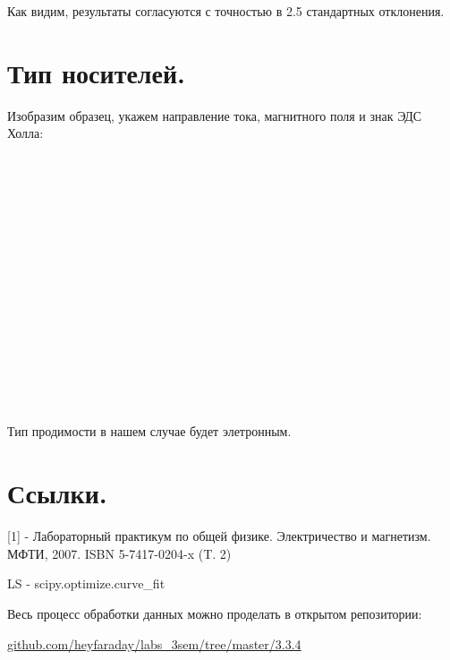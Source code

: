 Как видим, результаты согласуются с точностью в 2.5 стандартных отклонения.

\newpage
\section{\label{sec:level1}Тип носителей.}

Изобразим образец, укажем направление тока, магнитного поля и знак ЭДС Холла:
\\
\\
\\
\\
\\
\\
\\
\\
\\
\\
\\
\\
\\
\\
\\
\\
\\

Тип продимости в нашем случае будет элетронным. 

\section{\label{sec:level1}Ссылки.}
[1] - Лабораторный практикум по общей физике. Электричество и магнетизм. МФТИ, 2007. ISBN 5-7417-0204-x (T. 2)

LS - scipy.optimize.curve\_fit

Весь процесс обработки данных можно проделать в открытом репозитории:

\href{github.com/heyfaraday/labs_3sem/tree/master/3.1.2}{github.com/heyfaraday/labs\_3sem/tree/master/3.3.4}


